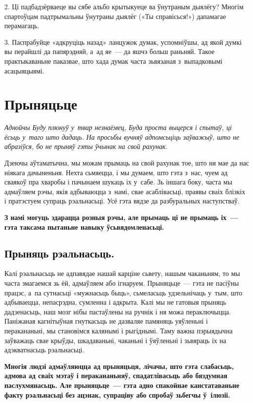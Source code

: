 2. Ці падбадзёрваеце вы сябе альбо крытыкуеце ва ўнутраным дыялёгу? Многім спартоўцам падтрымальны ўнутраны дыялёг («Ты справісься!») дапамагае перамагаць.

3. Паспрабуйце «адкруціць назад» ланцужок думак, успомніўшы, ад якой думкі вы перайшлі да папярэдняй, а~ад яе~--- да яшчэ больш раньняй. Такое практыкаваньне паказвае, што хада думак часта зьвязаная з~выпадковымі асацыяцыямі.


\section{Прыняцьце}

\emph{Аднойчы Буду плюнуў у~твар незнаёмец, Буда проста выцерся і спытаў, ці ёсьць у~таго што дадаць. На просьбы вучняў адпомсьціць заўважыў, што не абразіўся, бо не прыняў гэты ўчынак на свой рахунак.} 

Дзеючы аўтаматычна, мы можам прымаць на свой рахунак тое, што ня мае да нас ніякага дачыненьня. Нехта сьмяецца, і мы думаем, што гэта з~нас, чуем ад сваякоў пра хваробы і пачынаем шукаць іх у~сабе. Зь іншага боку, часта мы адмаўляем рэчы, якія адбываюцца з~намі, свае асаблівасьці, праявы сваіх блізкіх і пратэстуем супраць рэальнасьці. Усё гэта вядзе да разбуральных наступстваў.

\textbf{З намі могуць здарацца розныя рэчы, але прымаць ці не прымаць іх~--- гэта таксама пытаньне навыку ўсьвядомленасьці.}

\subsection*{Прыняць рэальнасьць.}

Калі рэальнасьць не адпавядае нашай карціне сьвету, нашым чаканьням, то мы часта змагаемся зь ёй, адмаўляем або ігнаруем. Прыняцьце~--- гэта не пасіўны працэс, а~па сутнасьці «мужнасьць быць», сьмеласьць удзельнічаць у~тым, што адбываецца, непасрэдна, сумленна і адкрыта. Калі мы не гатовыя прыняць дадзенасьць, наш мозг нібы пастаўлены на ручнік і ня можа пераключыцца. Паніжаная кагнітыўная гнуткасьць не дазваляе памяняць уяўленьні і перакананьні, мы становімся калянымі і рыгіднымі. Таму важна пэрыядычна заўважаць свае крыўды, шкадаваньні, чаканьні і ўяўленьні і зьвяраць іх на адэкватнасьць рэальнасьці.

\textbf{Многія людзі адмаўляюцца ад прыняцьця, лічачы, што гэта слабасьць, адмова ад сваіх мэтаў і перакананьняў, спадатлівасьць або бяздумная паслухмянасьць. Але прыняцьце~--- гэта адно спакойнае канстатаваньне факту рэальнасьці без ацэнак, супраціву або спробаў зьбегчы ў~ілюзіі.}

